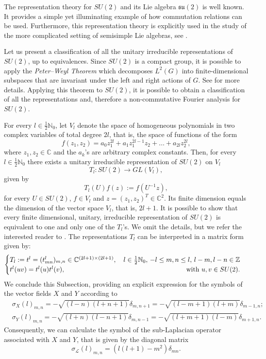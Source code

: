 \documentclass[12pt,oneside,a4paper]{book}
\numberwithin{equation}{section}     %
\theoremstyle{plain}
\theoremstyle{definition}
\newcommand{\C}{{\mathbb C}}
\newcommand{\Z}{{\mathbb Z}}
\newcommand{\N}{{\mathbb N}}
\newcommand{\slp}{{\mathcal L}}
\begin{document}
The representation theory for $SU(2)$ and its Lie algebra $\mathfrak{su}(2)$ is well known. It provides a simple yet illuminating example of how commutation relations can be used. Furthermore, this representation theory is explicitly used in the study of the more complicated setting of semisimple Lie algebras, see \cite[Part II]{H2003}.

Let us present a classification of all the unitary irreducible representations of $SU(2)$, up to equivalences. Since $SU(2)$ is a compact group, it is possible to apply the \textit{Peter--Weyl Theorem} which decomposes $L^2(G)$ into finite-dimensional subspaces that are invariant under the left and right actions of $G$. See \cite{H2003, RT2009} for more details. Applying this theorem to $SU(2)$, it is possible to obtain a classification of all the representations and, therefore a non-commutative Fourier analysis for $SU(2)$. 

For every $l\in\frac{1}{2}\N_0$, let $V_l$ denote the space of homogeneous polynomials in two complex variables of total degree $2l$, that is, the space of functions of the form
\[
f(z_1,z_2)=a_0z_1^{2l}+a_1z_1^{2l-1}z_2+\dots+a_{2l}z_2^{2l},
\]
where $z_1,z_2\in\C$ and the $a_k$'s are arbitrary complex constants. Then, for every $l\in\frac{1}{2}\N_0$ there exists a unitary irreducible representation of $SU(2)$ on $V_l$
\[
T_l:SU(2)\rightarrow GL(V_l),
\]
given by
\[
T_l(U)f(z):=f(U^{-1}z),
\]
for every $U\in SU(2)$, $f\in V_l$ and $z=(z_1,z_2)^T\in \C^2$. Its finite dimension equals the dimension of the vector space $V_l$, that is, $2l+1$. It is possible to show that every finite dimensional, unitary, irreducible representation of $SU(2)$ is equivalent to one and only one of the $T_l$'s. We omit the details, but we refer the interested reader to \cite{RT2009}. The representations $T_l$ can be interpreted in a matrix form given by:
\begin{align}\notag
\begin{cases}
T_l:=t^l=(t^l_{mn})_{m,n}\in\C^{(2l+1)\times(2l+1)},\quad l\in\frac{1}{2}\N_0,\,-l\leq m,n \leq l,\,l-m,l-n\in\Z\\
t^l(uv)=t^l(u)t^l(v),\hfill \text{with }u,v\in SU(2). 
\end{cases}
\end{align}
We conclude this Subsection, providing an explicit expression for the symbols of the vector fields $X$ and $Y$ according to \cite[Theorem 12.2.1]{RT2009}
\begin{align}\label{EQ:x}
&\sigma_X(l)_{m,n}=-\sqrt{(l-n)(l+n+1)}\delta_{m,n+1}=-\sqrt{(l-m+1)(l+m)}\delta_{m-1,n};\\\label{EQ:y}
&\sigma_Y(l)_{m,n}=-\sqrt{(l+n)(l-n+1)}\delta_{m,n-1}=-\sqrt{(l+m+1)(l-m)}\delta_{m+1,n}.
\end{align}
Consequently, we can calculate the symbol of the sub-Laplacian operator associated with $X$ and $Y$, that is given by the diagonal matrix
\begin{equation}\label{EQ:slp}
\sigma_\slp(l)_{m,n}=(l(l+1)-m^2)\delta_{mn}.
\end{equation}
\end{document}
